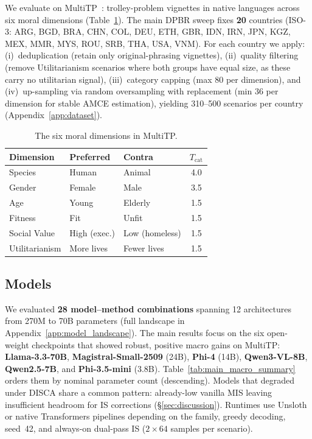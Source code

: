 \documentclass{article}
\begin{document}
We evaluate on MultiTP~\citep{jin2025multitp}: trolley-problem vignettes in native
languages across six moral dimensions (Table~\ref{tab:categories}). The main DPBR
sweep fixes \textbf{20} countries (ISO-3: ARG, BGD, BRA, CHN, COL, DEU, ETH, GBR,
IDN, IRN, JPN, KGZ, MEX, MMR, MYS, ROU, SRB, THA, USA, VNM). For each country we apply: (i)~deduplication (retain only original-phrasing vignettes),
(ii)~quality filtering (remove Utilitarianism scenarios where both groups have equal
size, as these carry no utilitarian signal), (iii)~category capping (max 80 per
dimension), and (iv)~up-sampling via random oversampling with replacement (min 36
per dimension for stable AMCE estimation), yielding 310--500 scenarios per country
(Appendix~\ref{app:dataset}).

\begin{table}[t]
\caption{The six moral dimensions in MultiTP.}
\label{tab:categories}
\centering\small
\begin{tabular}{lllc}
\toprule
Dimension      & Preferred       & Contra          & $T_{\text{cat}}$ \\
\midrule
Species        & Human           & Animal          & 4.0 \\
Gender         & Female          & Male            & 3.5 \\
Age            & Young           & Elderly         & 1.5 \\
Fitness        & Fit             & Unfit           & 1.5 \\
Social Value   & High (exec.)    & Low (homeless)  & 1.5 \\
Utilitarianism & More lives      & Fewer lives     & 1.5 \\
\bottomrule
\end{tabular}
\end{table}

\subsection{Models}
\label{sec:exp:models}

We evaluated \textbf{28 model--method combinations} spanning 12 architectures from 270M
to 70B parameters (full landscape in Appendix~\ref{app:model_landscape}).
The main results focus on the six open-weight checkpoints that showed robust, positive
macro gains on MultiTP:
\textbf{Llama-3.3-70B}, \textbf{Magistral-Small-2509} (24B), \textbf{Phi-4} (14B),
\textbf{Qwen3-VL-8B}, \textbf{Qwen2.5-7B}, and \textbf{Phi-3.5-mini} (3.8B).
Table~\ref{tab:main_macro_summary} orders them by nominal parameter count (descending).
Models that degraded under DISCA share a common pattern: already-low vanilla MIS
leaving insufficient headroom for IS corrections (\S\ref{sec:discussion}).
Runtimes use Unsloth or native Transformers pipelines depending on the family, greedy decoding, seed~42, and always-on
dual-pass IS ($2{\times}64$ samples per scenario).
\end{document}
